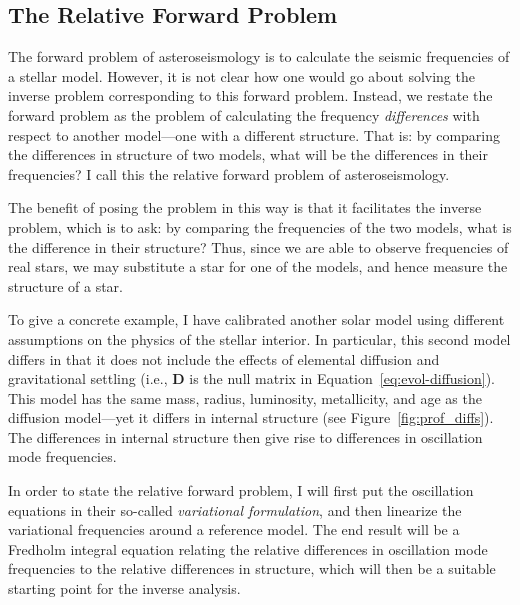 \subsection{The Relative Forward Problem} \label{sec:variational}
The forward problem of asteroseismology is to calculate the seismic frequencies of a stellar model. 
However, it is not clear how one would go about solving the inverse problem corresponding to this forward problem. 
Instead, we restate the forward problem as the problem of calculating the frequency \emph{differences} with respect to another model---one with a different structure. 
That is: by comparing the differences in structure of two models, what will be the differences in their frequencies? 
I call this the relative forward problem of asteroseismology. 

The benefit of posing the problem in this way is that it facilitates the inverse problem, which is to ask: by comparing the frequencies of the two models, what is the difference in their structure? 
Thus, since we are able to observe frequencies of real stars, we may substitute a star for one of the models, and hence measure the structure of a star. 

To give a concrete example, I have calibrated another solar model using different assumptions on the physics of the stellar interior. 
In particular, this second model differs in that it does not include the effects of elemental diffusion and gravitational settling (i.e., $\mathbf{D}$ is the null matrix in Equation~\ref{eq:evol-diffusion}). 
This model has the same mass, radius, luminosity, metallicity, and age as the diffusion model---yet it differs in internal structure (see Figure~\ref{fig:prof_diffs}). %
The differences in internal structure then give rise to differences in oscillation mode frequencies. %

In order to state the relative forward problem, I will first put the oscillation equations in their so-called \emph{variational formulation}, and then %
linearize the variational frequencies around a reference model. 
The end result will be a Fredholm integral equation relating the relative differences in oscillation mode frequencies to the relative differences in structure, which will then be a suitable starting point for the inverse analysis. 


